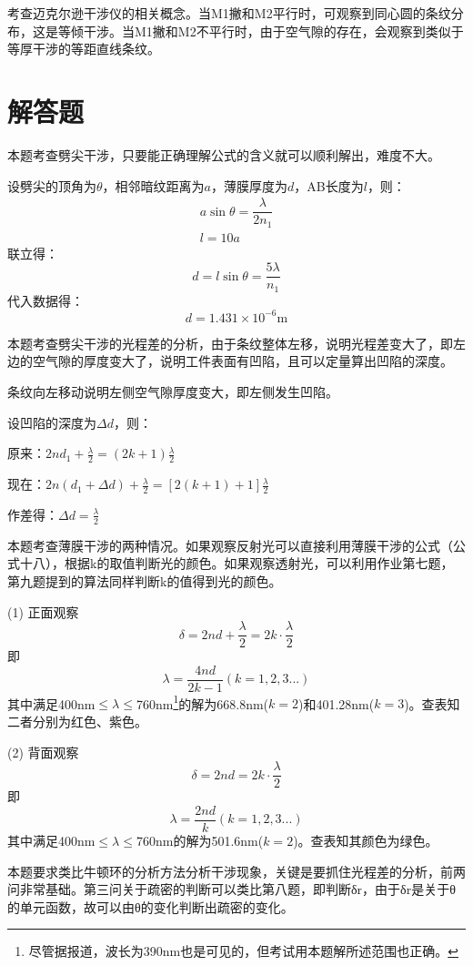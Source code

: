 \exercise 

\solve 考查迈克尔逊干涉仪的相关概念。当M1撇和M2平行时，可观察到同心圆的条纹分布，这是等倾干涉。当M1撇和M2不平行时，由于空气隙的存在，会观察到类似于等厚干涉的等距直线条纹。

\section{解答题}
\exercise 

\analysis
本题考查劈尖干涉，只要能正确理解公式的含义就可以顺利解出，难度不大。

\solve
设劈尖的顶角为$\theta$，相邻暗纹距离为$a$，薄膜厚度为$d$，AB长度为$l$，则：
\begin{gather*}
	a\sin\theta=\dfrac{\lambda}{2n_1}\\
	l=10a
\end{gather*}
联立得：
\[
d=l\sin\theta=\dfrac{5\lambda}{n_1}
\]
代入数据得：
\[
d=1.431\times 10^{-6}\mathrm{ m}
\]

\exercise 

\analysis
本题考查劈尖干涉的光程差的分析，由于条纹整体左移，说明光程差变大了，即左边的空气隙的厚度变大了，说明工件表面有凹陷，且可以定量算出凹陷的深度。

\solve
条纹向左移动说明左侧空气隙厚度变大，即左侧发生凹陷。

设凹陷的深度为$\Delta d$，则：

原来：$2nd_1+\frac{\lambda}{2}=(2k+1)\frac{\lambda}{2}$

现在：$2n(d_1+\Delta d)+\frac{\lambda}{2}=[2(k+1)+1]\frac{\lambda}{2}$

作差得：$\Delta d=\frac{\lambda}{2}$

\exercise 

\analysis
本题考查薄膜干涉的两种情况。如果观察反射光可以直接利用薄膜干涉的公式（公式十八），根据k的取值判断光的颜色。如果观察透射光，可以利用作业第七题，第九题提到的算法同样判断k的值得到光的颜色。

\solve
(1) 正面观察
\[
\delta=2nd+\dfrac{\lambda}{2}=2k\cdot \dfrac{\lambda}{2}
\]
即
\[
\lambda=\dfrac{4nd}{2k-1}(k=1,2,3...)
\]
其中满足400nm$\leqslant\lambda\leqslant$760nm\footnote{尽管据报道，波长为390nm也是可见的，但考试用本题解所述范围也正确。}的解为668.8nm($k=2$)和401.28nm($k=3$)。查表知二者分别为红色、紫色。

(2) 背面观察
\[
\delta=2nd=2k\cdot \frac{\lambda}{2}
\]
即
\[
\lambda=\dfrac{2nd}{k}(k=1,2,3...)
\]
其中满足400nm$\leqslant\lambda\leqslant$760nm的解为501.6nm($k=2$)。查表知其颜色为绿色。

\exercise 

\analysis
本题要求类比牛顿环的分析方法分析干涉现象，关键是要抓住光程差的分析，前两问非常基础。第三问关于疏密的判断可以类比第八题，即判断δr，由于δr是关于θ的单元函数，故可以由θ的变化判断出疏密的变化。
\solve

